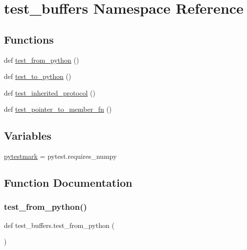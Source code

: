 \hypertarget{namespacetest__buffers}{}\section{test\+\_\+buffers Namespace Reference}
\label{namespacetest__buffers}
\subsection*{Functions}
\begin{DoxyCompactItemize}
\item 
def \mbox{\hyperlink{namespacetest__buffers_afc53bdd36d781f2dfc18e6b66df3ecd0}{test\+\_\+from\+\_\+python}} ()
\item 
def \mbox{\hyperlink{namespacetest__buffers_a4a406e49d9e743c397822899d9187b98}{test\+\_\+to\+\_\+python}} ()
\item 
def \mbox{\hyperlink{namespacetest__buffers_ad572849246603d1d882b05b4883a966f}{test\+\_\+inherited\+\_\+protocol}} ()
\item 
def \mbox{\hyperlink{namespacetest__buffers_abe5e9f45aa6ce0ac458e7b4fbf51b2f0}{test\+\_\+pointer\+\_\+to\+\_\+member\+\_\+fn}} ()
\end{DoxyCompactItemize}
\subsection*{Variables}
\begin{DoxyCompactItemize}
\item 
\mbox{\hyperlink{namespacetest__buffers_a33e92418334deccfeb5766833cfe7347}{pytestmark}} = pytest.\+requires\+\_\+numpy
\end{DoxyCompactItemize}


\subsection{Function Documentation}
\mbox{\label{namespacetest__buffers_afc53bdd36d781f2dfc18e6b66df3ecd0}} 
\subsubsection{\texorpdfstring{test\_from\_python()}{test\_from\_python()}}
{\footnotesize\ttfamily def test\+\_\+buffers.\+test\+\_\+from\+\_\+python (\begin{DoxyParamCaption}{ }\end{DoxyParamCaption})}

